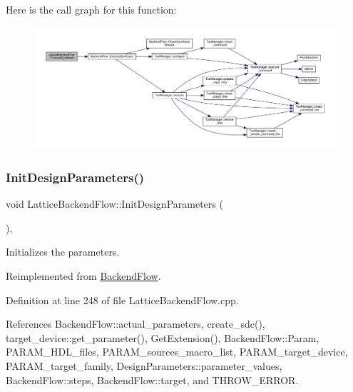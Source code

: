Here is the call graph for this function\+:
\nopagebreak
\begin{figure}[H]
\begin{center}
\leavevmode
\includegraphics[width=350pt]{de/dd0/classLatticeBackendFlow_adc9bf997d1ac830c4511521b1934bffc_cgraph}
\end{center}
\end{figure}
\mbox{\label{classLatticeBackendFlow_af31a3f147ec929266a696904d911ff6e}} 
\subsubsection{\texorpdfstring{Init\+Design\+Parameters()}{InitDesignParameters()}}
{\footnotesize\ttfamily void Lattice\+Backend\+Flow\+::\+Init\+Design\+Parameters (\begin{DoxyParamCaption}{ }\end{DoxyParamCaption})\hspace{0.3cm}{\ttfamily [override]}, {\ttfamily [virtual]}}



Initializes the parameters. 



Reimplemented from \hyperlink{classBackendFlow_a367d9917dc257ed6aa0bb5e97f57d2d4}{Backend\+Flow}.



Definition at line 248 of file Lattice\+Backend\+Flow.\+cpp.



References Backend\+Flow\+::actual\+\_\+parameters, create\+\_\+sdc(), target\+\_\+device\+::get\+\_\+parameter(), Get\+Extension(), Backend\+Flow\+::\+Param, P\+A\+R\+A\+M\+\_\+\+H\+D\+L\+\_\+files, P\+A\+R\+A\+M\+\_\+sources\+\_\+macro\+\_\+list, P\+A\+R\+A\+M\+\_\+target\+\_\+device, P\+A\+R\+A\+M\+\_\+target\+\_\+family, Design\+Parameters\+::parameter\+\_\+values, Backend\+Flow\+::steps, Backend\+Flow\+::target, and T\+H\+R\+O\+W\+\_\+\+E\+R\+R\+OR.

